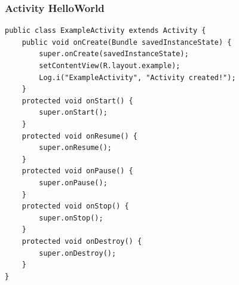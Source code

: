 \begin{frame}[fragile]
  \frametitle{Activity HelloWorld}
\begin{verbatim}
public class ExampleActivity extends Activity {
    public void onCreate(Bundle savedInstanceState) {
        super.onCreate(savedInstanceState);
        setContentView(R.layout.example);
        Log.i("ExampleActivity", "Activity created!");
    }
    protected void onStart() {
        super.onStart();
    }
    protected void onResume() {
        super.onResume();
    }
    protected void onPause() {
        super.onPause();
    }
    protected void onStop() {
        super.onStop();
    }
    protected void onDestroy() {
        super.onDestroy();
    }
}
\end{verbatim}
\end{frame}
